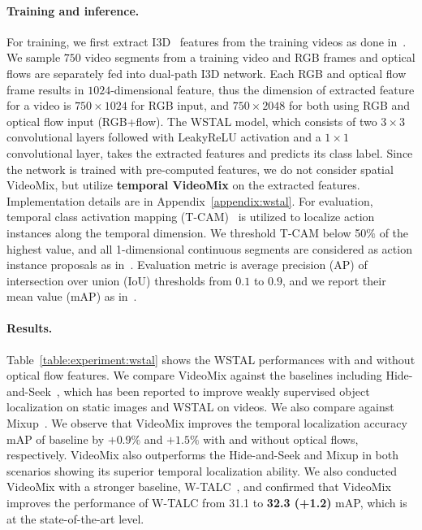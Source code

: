 \paragraph{Training and inference.}
For training, we first extract I3D~\cite{carreira2017quo} features from the training videos as done in~\cite{lee2020bas}.
We sample $750$ video segments from a training video and RGB frames and optical flows are separately fed into dual-path I3D network. 
Each RGB and optical flow frame results in $1024$-dimensional feature, thus the dimension of extracted feature for a video is $750\times1024$ for RGB input, and $750\times2048$ for both using RGB and optical flow input (RGB+flow).
The WSTAL model, which consists of two $3\times3$ convolutional layers followed with LeakyReLU activation and a $1\times1$ convolutional layer, takes the extracted features and predicts its class label.
Since the network is trained with pre-computed features, we do not consider spatial VideoMix, but utilize \textbf{temporal VideoMix} on the extracted features.
Implementation details are in Appendix~\ref{appendix:wstal}.
For evaluation, temporal class activation mapping (T-CAM)~\cite{zhou2016CAM,nguyen2018weakly} is utilized to localize action instances along the temporal dimension. 
We threshold T-CAM below 50$\%$ of the highest value, and all 1-dimensional continuous segments are considered as action instance proposals as in~\cite{singh2017hide}. 
Evaluation metric is average precision (AP) of intersection over union (IoU) thresholds from $0.1$ to $0.9$, and we report their mean value (mAP) as in~\cite{singh2017hide,nguyen2018weakly,lee2020bas}.




\paragraph{Results.}
Table~\ref{table:experiment:wstal} shows the WSTAL performances with and without optical flow features.
We compare VideoMix against the baselines including Hide-and-Seek~\cite{singh2017hide}, which has been reported to improve weakly supervised object localization on static images and WSTAL on videos.
We also compare against Mixup~\cite{zhang2017mixup}. 
We observe that VideoMix improves the temporal localization accuracy mAP of baseline by $+\mathbf{0.9}\%$ and $+\mathbf{1.5}\%$ with and without optical flows, respectively.
VideoMix also outperforms the Hide-and-Seek and Mixup in both scenarios showing its superior temporal localization ability.
We also conducted VideoMix with a stronger baseline, W-TALC~\cite{paul2018w}, and confirmed that VideoMix improves the performance of W-TALC from 31.1 to \textbf{32.3 (+1.2)} mAP, which is at the state-of-the-art level. 









